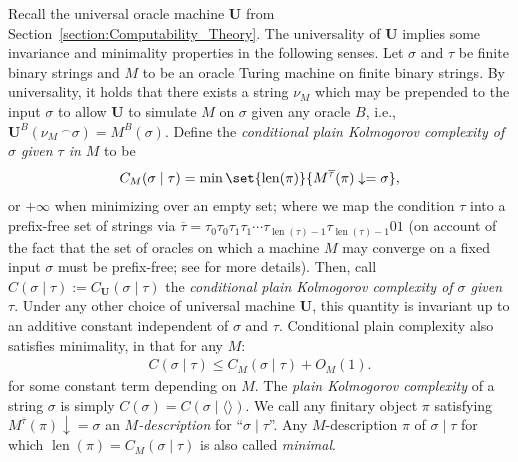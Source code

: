 Recall the universal oracle machine $\mathbf{U}$ from Section~\ref{section:Computability_Theory}. The universality of $\mathbf{U}$ implies some invariance and minimality properties in the following senses. Let $\sigma$ and $\tau$ be finite binary strings and $M$ to be an oracle Turing machine on finite binary strings. By universality, it holds that there exists a string $\nu_M$ which may be prepended to the input $\sigma$ to allow $\mathbf{U}$ to simulate $M$ on $\sigma$ given any oracle $B$, i.e., $\mathbf{U}^B(\nu_M\ ^\smallfrown \sigma) = M^B(\sigma)$. Define the \textit{conditional plain Kolmogorov complexity of $\sigma$ given $\tau$ in $M$} to be
\begin{align*}
    C_M(\sigma \mid \tau) = \min \set{\operatorname{len}(\pi)}{M^{\overline{\tau}}(\pi) \downarrow= \sigma},
\end{align*}
or $+\infty$ when minimizing over an empty set; where we map the condition $\tau$ into a prefix-free set of strings via $\overline{\tau} = \tau_0 \tau_0 \tau_1 \tau_1 \cdots \tau_{\operatorname{len}(\tau) - 1} \tau_{\operatorname{len}(\tau) - 1} 01$ (on account of the fact that the set of oracles on which a machine $M$ may converge on a fixed input $\sigma$ must be prefix-free; see \cite{DH10} for more details). Then, call $C(\sigma \mid \tau) := C_{\mathbf{U}}(\sigma \mid \tau)$ the \textit{conditional plain Kolmogorov complexity of $\sigma$ given $\tau$}. 
Under any other choice of universal machine $\mathbf{U}$, this quantity is invariant up to an additive constant independent of $\sigma$ and $\tau$. Conditional plain complexity also satisfies minimality, in that for any $M$:
\begin{align*}
    C(\sigma \mid \tau) \leq C_M(\sigma \mid \tau) + O_M(1).
\end{align*}
for some constant term depending on $M$. The \textit{plain Kolmogorov complexity} of a string $\sigma$ is simply $C(\sigma) = C(\sigma \mid \langle \rangle)$. We call any finitary object $\pi$ satisfying $M^{\overline{\tau}}(\pi) \downarrow = \sigma$ an \textit{$M$-description} for ``$\sigma \mid \tau$''. Any $M$-description $\pi$ of $\sigma \mid \tau$ for which $\operatorname{len}(\pi) = C_M(\sigma \mid \tau)$ is also called \textit{minimal}.


